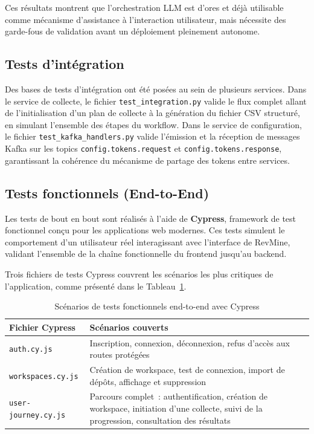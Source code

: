Ces résultats montrent que l'orchestration LLM est d'ores et déjà utilisable comme mécanisme
d'assistance à l'interaction utilisateur, mais nécessite des garde-fous de validation avant un
déploiement pleinement autonome.

\subsection{Tests d'intégration}

Des bases de tests d'intégration ont été posées au sein de plusieurs services. Dans le service
de collecte, le fichier \texttt{test\_integration.py} valide le flux complet allant de
l'initialisation d'un plan de collecte à la génération du fichier CSV structuré, en simulant
l'ensemble des étapes du workflow. Dans le service de configuration, le fichier
\texttt{test\_kafka\_handlers.py} valide l'émission et la réception de messages Kafka sur les
topics \texttt{config.tokens.request} et \texttt{config.tokens.response}, garantissant la
cohérence du mécanisme de partage des tokens entre services.

\subsection{Tests fonctionnels (End-to-End)}

Les tests de bout en bout sont réalisés à l'aide de \textbf{Cypress}, framework de test
fonctionnel conçu pour les applications web modernes. Ces tests simulent le comportement d'un
utilisateur réel interagissant avec l'interface de RevMine, validant l'ensemble de la chaîne
fonctionnelle du frontend jusqu'au backend.

Trois fichiers de tests Cypress couvrent les scénarios les plus critiques de l'application,
comme présenté dans le Tableau~\ref{tab:tests-cypress}.

\begin{table}[H]
\centering
\small
\caption{Scénarios de tests fonctionnels end-to-end avec Cypress}
\label{tab:tests-cypress}
\begin{tabular}{|>{\raggedright\arraybackslash}p{4cm}
                |>{\raggedright\arraybackslash}p{9cm}|}
\hline
\textbf{Fichier Cypress} & \textbf{Scénarios couverts} \\
\hline
\texttt{auth.cy.js} & Inscription, connexion, déconnexion, refus d'accès aux routes protégées \\
\hline
\texttt{workspaces.cy.js} & Création de workspace, test de connexion, import de dépôts, affichage et suppression \\
\hline
\texttt{user-journey.cy.js} & Parcours complet~: authentification, création de workspace, initiation d'une collecte, suivi de la progression, consultation des résultats \\
\hline
\end{tabular}
\end{table}

